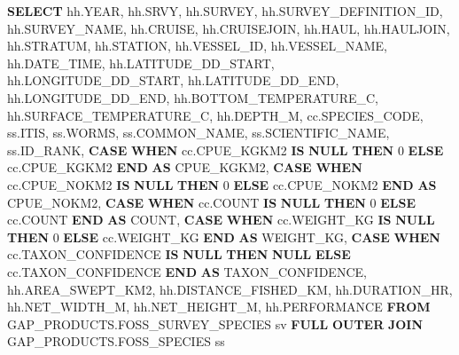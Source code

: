\documentclass[
  letterpaper,
  oneside,
  open=any]{scrbook}
\newenvironment{Shaded}{\begin{snugshade}}{\end{snugshade}}
\newcommand{\ControlFlowTok}[1]{\textcolor[rgb]{0.00,0.23,0.31}{\textbf{#1}}}
\newcommand{\DataTypeTok}[1]{\textcolor[rgb]{0.68,0.00,0.00}{#1}}
\newcommand{\DecValTok}[1]{\textcolor[rgb]{0.68,0.00,0.00}{#1}}
\newcommand{\FunctionTok}[1]{\textcolor[rgb]{0.28,0.35,0.67}{#1}}
\newcommand{\KeywordTok}[1]{\textcolor[rgb]{0.00,0.23,0.31}{\textbf{#1}}}
\newcommand{\NormalTok}[1]{\textcolor[rgb]{0.00,0.23,0.31}{#1}}
\begin{document}
\begin{Shaded}
\begin{Highlighting}[]

\KeywordTok{SELECT} 
\NormalTok{hh.}\DataTypeTok{YEAR}\NormalTok{,}
\NormalTok{hh.SRVY,                 }
\NormalTok{hh.SURVEY,}
\NormalTok{hh.SURVEY\_DEFINITION\_ID,}
\NormalTok{hh.SURVEY\_NAME,}
\NormalTok{hh.CRUISE,}
\NormalTok{hh.CRUISEJOIN,           }
\NormalTok{hh.HAUL,}
\NormalTok{hh.HAULJOIN,}
\NormalTok{hh.STRATUM,}
\NormalTok{hh.STATION,}
\NormalTok{hh.VESSEL\_ID,}
\NormalTok{hh.VESSEL\_NAME,          }
\NormalTok{hh.DATE\_TIME,}
\NormalTok{hh.LATITUDE\_DD\_START, }
\NormalTok{hh.LONGITUDE\_DD\_START, }
\NormalTok{hh.LATITUDE\_DD\_END,}
\NormalTok{hh.LONGITUDE\_DD\_END, }
\NormalTok{hh.BOTTOM\_TEMPERATURE\_C,}
\NormalTok{hh.SURFACE\_TEMPERATURE\_C,}
\NormalTok{hh.DEPTH\_M,}
\NormalTok{cc.SPECIES\_CODE,}
\NormalTok{ss.ITIS,}
\NormalTok{ss.WORMS,}
\NormalTok{ss.COMMON\_NAME,     }
\NormalTok{ss.SCIENTIFIC\_NAME,}
\NormalTok{ss.ID\_RANK,}
\ControlFlowTok{CASE} \ControlFlowTok{WHEN}\NormalTok{ cc.CPUE\_KGKM2 }\KeywordTok{IS} \KeywordTok{NULL} \ControlFlowTok{THEN} \DecValTok{0} \ControlFlowTok{ELSE}\NormalTok{ cc.CPUE\_KGKM2 }\ControlFlowTok{END} \KeywordTok{AS}\NormalTok{ CPUE\_KGKM2,}
\ControlFlowTok{CASE} \ControlFlowTok{WHEN}\NormalTok{ cc.CPUE\_NOKM2 }\KeywordTok{IS} \KeywordTok{NULL} \ControlFlowTok{THEN} \DecValTok{0} \ControlFlowTok{ELSE}\NormalTok{ cc.CPUE\_NOKM2 }\ControlFlowTok{END} \KeywordTok{AS}\NormalTok{ CPUE\_NOKM2,}
\ControlFlowTok{CASE} \ControlFlowTok{WHEN}\NormalTok{ cc.}\FunctionTok{COUNT} \KeywordTok{IS} \KeywordTok{NULL} \ControlFlowTok{THEN} \DecValTok{0} \ControlFlowTok{ELSE}\NormalTok{ cc.}\FunctionTok{COUNT} \ControlFlowTok{END} \KeywordTok{AS} \FunctionTok{COUNT}\NormalTok{,}
\ControlFlowTok{CASE} \ControlFlowTok{WHEN}\NormalTok{ cc.WEIGHT\_KG }\KeywordTok{IS} \KeywordTok{NULL} \ControlFlowTok{THEN} \DecValTok{0} \ControlFlowTok{ELSE}\NormalTok{ cc.WEIGHT\_KG }\ControlFlowTok{END} \KeywordTok{AS}\NormalTok{ WEIGHT\_KG,}
\ControlFlowTok{CASE} \ControlFlowTok{WHEN}\NormalTok{ cc.TAXON\_CONFIDENCE }\KeywordTok{IS} \KeywordTok{NULL} \ControlFlowTok{THEN} \KeywordTok{NULL} \ControlFlowTok{ELSE}\NormalTok{ cc.TAXON\_CONFIDENCE }\ControlFlowTok{END} \KeywordTok{AS}\NormalTok{ TAXON\_CONFIDENCE,}
\NormalTok{hh.AREA\_SWEPT\_KM2,       }
\NormalTok{hh.DISTANCE\_FISHED\_KM,}
\NormalTok{hh.DURATION\_HR,          }
\NormalTok{hh.NET\_WIDTH\_M,}
\NormalTok{hh.NET\_HEIGHT\_M,}
\NormalTok{hh.PERFORMANCE }
\KeywordTok{FROM}\NormalTok{ GAP\_PRODUCTS.FOSS\_SURVEY\_SPECIES sv}
\KeywordTok{FULL} \KeywordTok{OUTER} \KeywordTok{JOIN}\NormalTok{ GAP\_PRODUCTS.FOSS\_SPECIES ss}

\end{Highlighting}
\end{Shaded}
\end{document}
